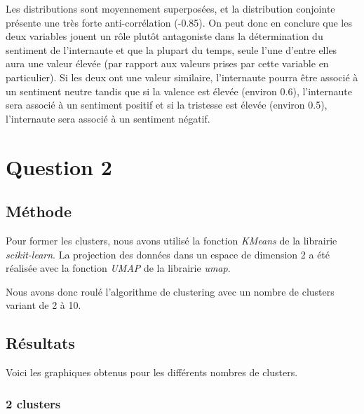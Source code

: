 \documentclass{article}
\begin{document}
Les distributions sont moyennement superposées, et la distribution conjointe présente une très
forte anti-corrélation (-0.85). On peut donc en conclure que les deux variables jouent
un rôle plutôt antagoniste dans la détermination du sentiment de l'internaute et que
la plupart du temps, seule l'une d'entre elles aura une valeur élevée 
(par rapport aux valeurs prises par cette variable en particulier). Si les deux ont une
valeur similaire, l'internaute pourra être associé à un sentiment neutre tandis que
si la valence est élevée (environ 0.6), l'internaute sera associé à un sentiment positif et
si la tristesse est élevée (environ 0.5), l'internaute sera associé à un sentiment négatif.


\newpage

\section*{Question 2}

\subsection*{Méthode}

Pour former les clusters, nous avons utilisé la fonction \textit{KMeans} de la librairie 
\textit{scikit-learn}. La projection des données dans un espace de dimension 2 a été réalisée
avec la fonction \textit{UMAP} de la librairie \textit{umap}. 

Nous avons donc roulé l'algorithme de clustering avec un nombre de clusters variant de 2 à 10.

\subsection*{Résultats}

Voici les graphiques obtenus pour les différents nombres de clusters.

\subsubsection*{2 clusters}
\end{document}
